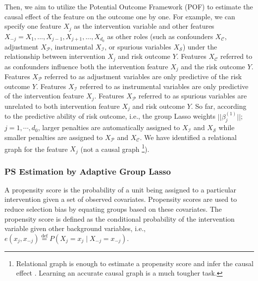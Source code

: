 \documentclass[letterpaper]{article} %
\theoremstyle{definition}
\theoremstyle{remark}
\begin{document}
Then, we aim to utilize the Potential Outcome Framework (POF) \cite{rubin1974estimating,chu2020matching,chu2022learning} to estimate the causal effect of the feature on the outcome one by one. For example, we can specify one feature $X_j$ as the intervention variable and other features $X_{-j} = X_1,..., X_{j-1}, X_{j+1},..., X_{d_0}$ as other roles (such as confounders $X_\mathcal{C}$, adjustment $X_\mathcal{P}$, instrumental $X_\mathcal{I}$, or spurious variables $X_\mathcal{S}$) under the relationship between intervention $X_j$ and risk outcome $Y$. Features $X_\mathcal{C}$ referred to as confounders influence both the intervention feature $X_j$ and the risk outcome $Y$. Features $X_\mathcal{P}$ referred to as adjustment variables are only predictive of the risk outcome $Y$. Features $X_\mathcal{I}$ referred to as instrumental variables are only predictive of the intervention feature $X_j$. Features $X_\mathcal{P}$ referred to as spurious variables are unrelated to both intervention feature $X_j$ and risk outcome $Y$. So far, according to the predictive ability of risk outcome, i.e., the group Lasso weights $||\beta_j^{(1)}||$; $j=1,\cdots,d_0$, larger penalties are automatically assigned to $X_\mathcal{I}$ and $X_\mathcal{S}$ while smaller penalties are assigned to $X_\mathcal{P}$ and $X_\mathcal{C}$. We have identified a relational graph for the feature $X_j$ (not a causal graph \footnote{Relational graph is enough to estimate a propensity score and infer the causal effect \cite{shortreed2017outcome}. Learning an accurate causal graph is a much tougher task.}). 


\subsubsection{PS Estimation by Adaptive Group Lasso}

A propensity score is the probability of a unit being assigned to a particular intervention given a set of observed covariates. Propensity scores are used to reduce selection bias by equating groups based on these covariates. The propensity score is defined as the conditional probability of the intervention variable given other background variables, i.e., $e(x_j, x_{-j}) \stackrel{\text{def}}{=} P(X_j=x_j\mid X_{-j}=x_{-j})$. 
\end{document}
